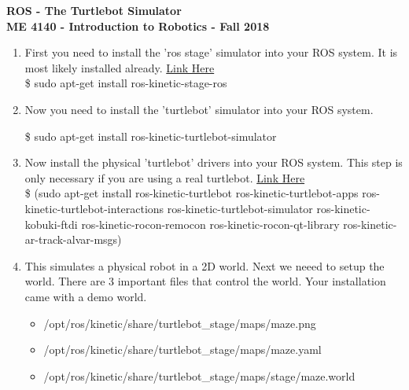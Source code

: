 \documentclass[12pt]{article}
\newcommand{\rosdistro}{kinetic}
\newcommand{\pthname}{/opt/ros/\rosdistro/share/turtlebot\_stage/maps/}
\begin{document}
\thispagestyle{plain}

\begin{center}
   {\bf \Large ROS - The Turtlebot Simulator}\vspace{2mm} \\
   {\bf \large ME 4140 - Introduction to Robotics - Fall 2018} \\
\end{center}


\begin{enumerate}
	
	\item First you need to install the 'ros stage' simulator into your ROS system. It is most likely installed already. \href{http://wiki.ros.org/turtlebot_simulator} {Link Here} \\
    
	{\selectfont  \hspace{5mm} \$ sudo apt-get install ros-\rosdistro-stage-ros }
	
    \item Now you need to install the 'turtlebot' simulator into your ROS system.
    
	{\selectfont  \hspace{5mm} \$ sudo apt-get install ros-\rosdistro-turtlebot-simulator }
	
    \item Now install the physical 'turtlebot' drivers into your ROS system. This step is only necessary if you are using a real turtlebot. \href{http://wiki.ros.org/turtlebot/Tutorials/\rosdistro/Turtlebot%20Installation} {Link Here} \\
    
    {\selectfont  \hspace{5mm} \$ (sudo apt-get install ros-\rosdistro-turtlebot ros-\rosdistro-turtlebot-apps ros-\rosdistro-turtlebot-interactions ros-\rosdistro-turtlebot-simulator ros-\rosdistro-kobuki-ftdi ros-\rosdistro-rocon-remocon ros-\rosdistro-rocon-qt-library ros-\rosdistro-ar-track-alvar-msgs})
    
    \item This simulates a physical robot in a 2D world. Next we neeed to setup the world. There are 3 important files that control the world. Your installation came with a demo world.
    \begin{itemize}
    
        \item {\selectfont  \hspace{5mm} \pthname maze.png}
        \item {\selectfont  \hspace{5mm} \pthname maze.yaml}
        \item {\selectfont  \hspace{5mm} \pthname stage/maze.world}
    

\end{itemize}
\end{enumerate}
\end{document}
